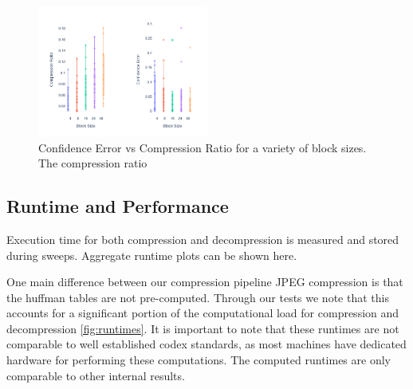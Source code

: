 \begin{figure}
    \includegraphics[width=0.5\textwidth]{assets/Confidence Err Vs Block Size.png}
    \caption{Confidence Error vs Compression Ratio for a variety of block sizes. The compression ratio }
    \label{fig:block_size_sweep}
\end{figure}
\subsection{Runtime and Performance}
Execution time for both compression and decompression is measured and stored during sweeps. Aggregate runtime plots can be shown here.

One main difference between our compression pipeline JPEG compression is that the huffman tables are not pre-computed. Through our tests we note that this accounts for a significant portion of the computational load for compression and decompression \ref{fig:runtimes}. It is important to note that these runtimes are not comparable to well established codex standards, as most machines have dedicated hardware for performing these computations. The computed runtimes are only comparable to other internal results. 

